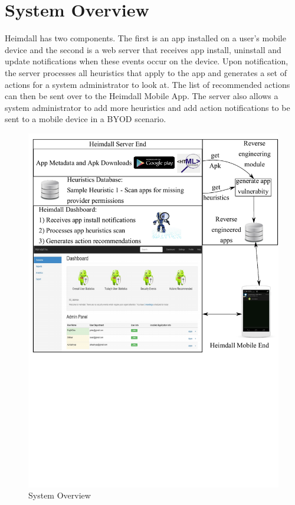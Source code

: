 \section{System Overview}
\label{overview}
\noindent
Heimdall has two components. The first is an app installed on a user's mobile device and the second is a web server that receives app install, uninstall and update notifications when these events occur on the device. Upon notification, the server processes all heuristics that apply to the app and generates a set of actions for a system administrator to look at. The list of recommended actions can then be sent over to the Heimdall Mobile App. The server also allows a system administrator to add more heuristics and add action notifications to be sent to a mobile device in a BYOD scenario.

\begin{figure}[tb]
	\centering
	\includegraphics[width=\columnwidth]{images/architecture}
	\caption{System Overview}
	\label{fig:arch}
\end{figure}

